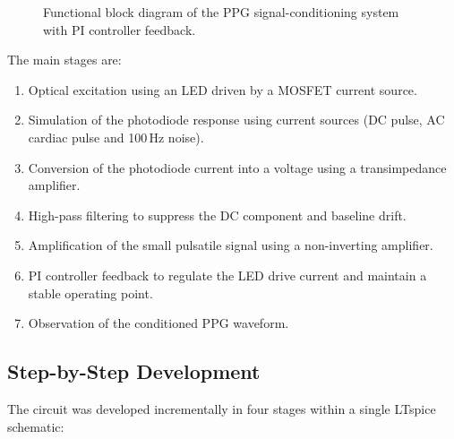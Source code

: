 \documentclass[10pt]{article}
\begin{document}
\begin{figure}[H]
\centering
{}
\caption{Functional block diagram of the PPG signal-conditioning system with PI controller feedback.}
\end{figure}

The main stages are:

\begin{enumerate}
    \item Optical excitation using an LED driven by a MOSFET current source.
    \item Simulation of the photodiode response using current sources (DC pulse, AC cardiac pulse and 100\,Hz noise).
    \item Conversion of the photodiode current into a voltage using a transimpedance amplifier.
    \item High-pass filtering to suppress the DC component and baseline drift.
    \item Amplification of the small pulsatile signal using a non-inverting amplifier.
    \item PI controller feedback to regulate the LED drive current and maintain a stable operating point.
    \item Observation of the conditioned PPG waveform.
\end{enumerate}

\subsection{Step-by-Step Development}

The circuit was developed incrementally in four stages within a single LTspice schematic:
\end{document}
